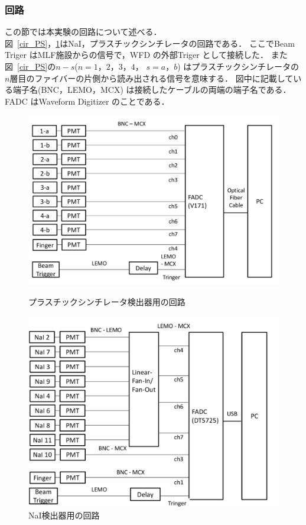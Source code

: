 \subsubsection{回路}
この節では本実験の回路について述べる．\\
図~\ref{cir_PS}，\ref{cir_nai}はNaI，プラスチックシンチレータの回路である．
ここでBeam Triger はMLF施設からの信号で，WFD の外部Triger として接続した．
また図~\ref{cir_PS}の$n-s$($n=1，2，3，4$， $s=a，b$) はプラスチックシンチレータの$n$層目のファイバーの片側から読み出される信号を意味する．
図中に記載している端子名(BNC，LEMO，MCX) は接続したケーブルの両端の端子名である．FADC はWaveform Digitizer のことである．
\begin{figure}[H]
  \begin{minipage}{0.45\hsize}
    \begin{center}
      \includegraphics[width=1\textwidth]{figure/tajima/circuit_ps_2.png}
      \caption{プラスチックシンチレータ検出器用の回路}
      \label{cir_PS}
    \end{center}
  \end{minipage}
  \hfill
  \begin{minipage}{0.45\hsize}
    \begin{center}
      \includegraphics[width=1\textwidth]{figure/tajima/circuit_nai.png}
      \caption{NaI検出器用の回路}
      \label{cir_nai}
    \end{center}
  \end{minipage}
\end{figure}
